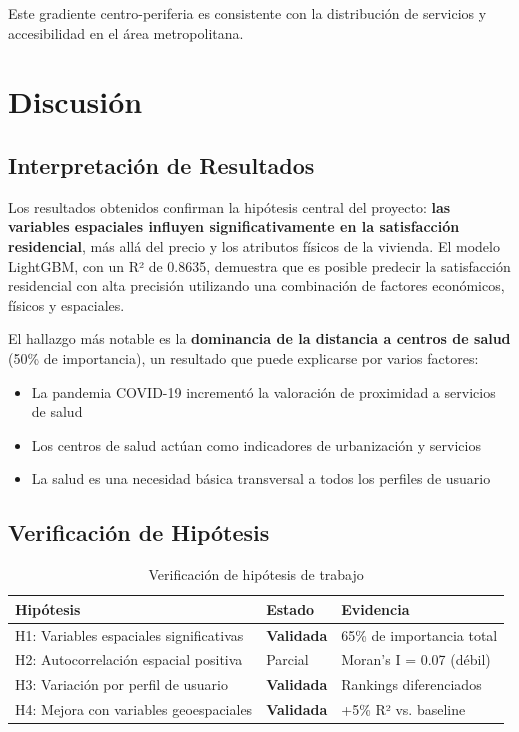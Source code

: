 \documentclass[11pt,letterpaper]{article}
\begin{document}
Este gradiente centro-periferia es consistente con la distribución de servicios y accesibilidad en el área metropolitana.

\newpage
\section{Discusión}

\subsection{Interpretación de Resultados}

Los resultados obtenidos confirman la hipótesis central del proyecto: \textbf{las variables espaciales influyen significativamente en la satisfacción residencial}, más allá del precio y los atributos físicos de la vivienda. El modelo LightGBM, con un R² de 0.8635, demuestra que es posible predecir la satisfacción residencial con alta precisión utilizando una combinación de factores económicos, físicos y espaciales.

El hallazgo más notable es la \textbf{dominancia de la distancia a centros de salud} (50\% de importancia), un resultado que puede explicarse por varios factores:
\begin{itemize}
    \item La pandemia COVID-19 incrementó la valoración de proximidad a servicios de salud
    \item Los centros de salud actúan como indicadores de urbanización y servicios
    \item La salud es una necesidad básica transversal a todos los perfiles de usuario
\end{itemize}

\subsection{Verificación de Hipótesis}

\begin{table}[H]
\centering
\caption{Verificación de hipótesis de trabajo}
\label{tab:hipotesis}
\begin{tabular}{@{}lll@{}}
\toprule
\textbf{Hipótesis} & \textbf{Estado} & \textbf{Evidencia} \\
\midrule
H1: Variables espaciales significativas & \textbf{Validada} & 65\% de importancia total \\
H2: Autocorrelación espacial positiva & Parcial & Moran's I = 0.07 (débil) \\
H3: Variación por perfil de usuario & \textbf{Validada} & Rankings diferenciados \\
H4: Mejora con variables geoespaciales & \textbf{Validada} & +5\% R² vs. baseline \\
\bottomrule
\end{tabular}
\end{table}
\end{document}
